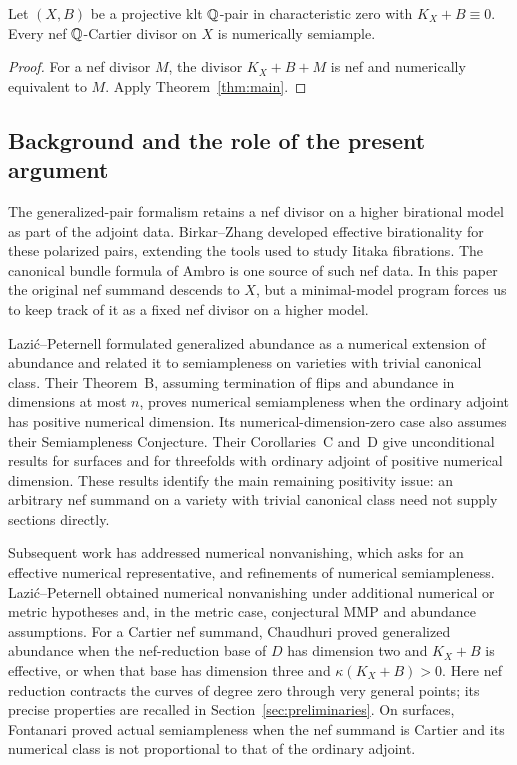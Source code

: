 \begin{corollary}\label{cor:cy}
Let $(X,B)$ be a projective klt $\mathbb Q$-pair in characteristic zero with
$K_X+B\equiv0$. Every nef $\mathbb Q$-Cartier divisor on $X$ is numerically
semiample.
\end{corollary}
\begin{proof}
For a nef divisor $M$, the divisor $K_X+B+M$ is nef and numerically
equivalent to $M$. Apply Theorem~\ref{thm:main}.
\end{proof}

\subsection{Background and the role of the present argument}

The generalized-pair formalism retains a nef divisor on a higher
birational model as part of the adjoint data. Birkar--Zhang \cite{BZ}
developed effective birationality for these polarized pairs, extending
the tools used to study Iitaka fibrations. The canonical bundle formula
of Ambro \cite{Ambro} is one source of such nef data. In this paper the
original nef summand descends to $X$, but a minimal-model program forces
us to keep track of it as a fixed nef divisor on a higher model.

Lazi\'c--Peternell \cite{LP} formulated generalized abundance as a
numerical extension of abundance and related it to semiampleness on
varieties with trivial canonical class. Their Theorem~B, assuming
termination of flips and abundance in dimensions at most $n$, proves
numerical semiampleness when the ordinary adjoint has positive numerical
dimension. Its numerical-dimension-zero case also assumes their
Semiampleness Conjecture. Their Corollaries~C and~D give unconditional
results for surfaces and for threefolds with ordinary adjoint of positive
numerical dimension. These results identify the main remaining
positivity issue: an arbitrary nef summand on a variety with trivial
canonical class need not supply sections directly.

Subsequent work has addressed numerical nonvanishing, which asks for
an effective numerical representative, and refinements of numerical
semiampleness. Lazi\'c--Peternell \cite[Theorems~B and~C]{LPII}
obtained numerical nonvanishing under additional numerical or metric
hypotheses and, in the metric case, conjectural MMP and abundance
assumptions. For a Cartier nef summand, Chaudhuri
\cite[Corollary~3]{Chaudhuri} proved generalized abundance when the
nef-reduction base of $D$ has dimension two and $K_X+B$ is effective,
or when that base has dimension three and $\kappa(K_X+B)>0$.
Here nef reduction contracts the curves of degree zero through very
general points; its precise properties are recalled in
Section~\ref{sec:preliminaries}. On surfaces, Fontanari
\cite[Theorem~1.4]{Fontanari} proved actual semiampleness when the nef
summand is Cartier and its numerical class is not proportional to
that of the ordinary adjoint.

